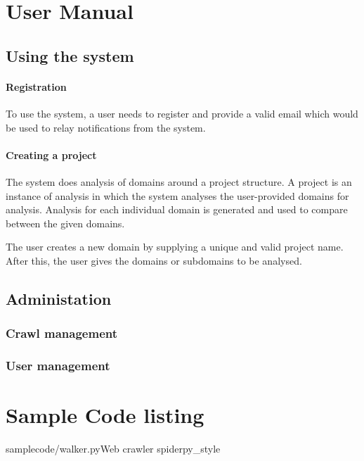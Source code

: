 \appendix
\chapter{User Manual}
\section{Using the system}
\subsubsection{Registration}

\noindent
To use the system, a user needs to register and provide a valid email which would be used to relay notifications from the system.
\subsubsection{Creating a project}

\noindent
The system does analysis of domains around a project structure. A project is an instance of analysis in which the system analyses the user-provided domains for analysis. Analysis for each individual domain is generated and used to compare between the given domains. 

\noindent
The user creates a new domain by supplying a unique and valid project name. After this, the user gives the domains or subdomains to be analysed.

\section{Administation}

\subsection{Crawl management}

\subsection{User management}

\chapter{Sample Code listing}
	\begin{codesnippet}{samplecode/walker.py}{Web crawler spider}{py_style}
	\end{codesnippet}

